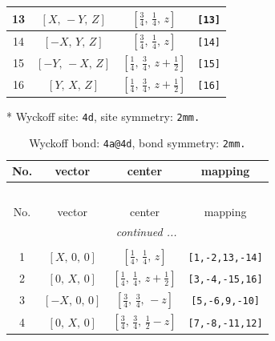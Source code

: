 \documentclass[fleqn,8pt]{jsarticle}
\begin{document}
\begin{longtable}{cccc}
13 & $\left[ X,\, - Y,\, Z \right]$ & $\left[ \frac{3}{4},\, \frac{1}{4},\, z \right]$ & {\tt [13]} \\ \hline
14 & $\left[ - X,\, Y,\, Z \right]$ & $\left[ \frac{3}{4},\, \frac{1}{4},\, z \right]$ & {\tt [14]} \\ \hline
15 & $\left[ - Y,\, - X,\, Z \right]$ & $\left[ \frac{1}{4},\, \frac{3}{4},\, z + \frac{1}{2} \right]$ & {\tt [15]} \\ \hline
16 & $\left[ Y,\, X,\, Z \right]$ & $\left[ \frac{1}{4},\, \frac{3}{4},\, z + \frac{1}{2} \right]$ & {\tt [16]} \\
\end{longtable}
* Wyckoff site: {\tt 4d}, site symmetry: {\tt 2mm.}
\renewcommand{\arraystretch}{1.2}
\begin{longtable}{cccc}
\caption{Wyckoff bond: {\tt 4a@4d}, bond symmetry: {\tt 2mm.}}
 \\
 \hline \hline
No. & vector & center & mapping \\ \hline \endfirsthead

\multicolumn{3}{l}{\tablename\ \thetable{}} \\
 \hline \hline
No. & vector & center & mapping \\ \hline \endhead

 \hline \hline
\multicolumn{3}{r}{\footnotesize\it continued ...} \\ \endfoot

 \hline \hline
\multicolumn{3}{r}{} \\ \endlastfoot

1 & $\left[ X,\, 0,\, 0 \right]$ & $\left[ \frac{1}{4},\, \frac{1}{4},\, z \right]$ & {\tt [1,-2,13,-14]} \\ \hline
2 & $\left[ 0,\, X,\, 0 \right]$ & $\left[ \frac{1}{4},\, \frac{1}{4},\, z + \frac{1}{2} \right]$ & {\tt [3,-4,-15,16]} \\ \hline
3 & $\left[ - X,\, 0,\, 0 \right]$ & $\left[ \frac{3}{4},\, \frac{3}{4},\, - z \right]$ & {\tt [5,-6,9,-10]} \\ \hline
4 & $\left[ 0,\, X,\, 0 \right]$ & $\left[ \frac{3}{4},\, \frac{3}{4},\, \frac{1}{2} - z \right]$ & {\tt [7,-8,-11,12]} \\
\end{longtable}
\renewcommand{\arraystretch}{1.2}
\end{document}
